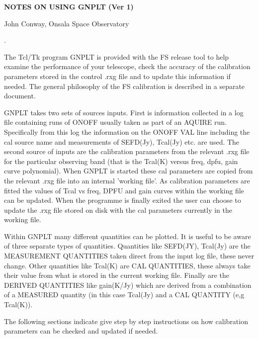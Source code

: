 \topmargin 0in
\textheight 8.5in
\oddsidemargin 0in
\textwidth 6.1in





\centerline{\large \bf NOTES ON USING GNPLT (Ver 1)}
\vskip 0.4cm
\centerline{ John Conway, Onsala Space Observatory}.
\noindent
\vskip 2cm

\vskip 0.5cm

  The Tcl/Tk program GNPLT is provided with the FS release 
  tool to help examine the performance 
  of your telescope, check the accuracy of the 
  calibration parameters stored in the control .rxg file 
  and to  update  this information if needed. The general 
  philosophy of the FS calibration is described in a separate 
  document.

  GNPLT takes two sets of sources inputs. First is information 
  collected in a log file containing  runs of  ONOFF usually 
  taken as part of an AQUIRE run.
  Specifically from this log the information on the ONOFF VAL line 
  including the  cal source name and  measurements of SEFD(Jy), Tcal(Jy) etc. 
  are used. The second source of inputs  are the 
  calibration parameters   from the relevant .rxg file 
  for the particular observing band  (that is the Tcal(K) versus freq, dpfu,
   gain curve polynomial). When GNPLT is started 
   these cal parameters are  copied from the relevant .rxg file into an  
   internal 'working file'. As calibration parameters are fitted the 
   values of Tcal vs freq, DPFU and gain curves within the working 
   file can be  updated. When the programme is finally 
   exited the user can choose to update the .rxg file stored on disk 
   with  the cal parameters currently in the working file. 

   Within GNPLT many different quantities  can be plotted.
   It is useful to be aware of three separate types of quantities.  
   Quantities like SEFD(JY), Tcal(Jy) are the MEASUREMENT QUANTITIES   
   taken direct from the input log file, these never change. 
   Other quantities like  Tcal(K) are CAL QUANTITIES,  these always 
   take their value from what is stored  in the current working file. 
   Finally  are the DERIVED QUANTITIES like gain(K/Jy) which are derived from
   a combination of a MEASURED quantity (in this case Tcal(Jy) and a 
   CAL QUANTITY (e,g Tcal(K)). 

   The following sections indicate give step by step instructions on 
  how calibration parameters 
   can be checked and updated if needed. 

